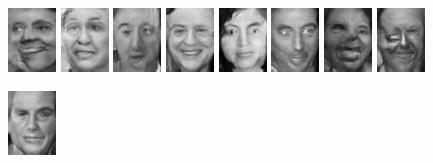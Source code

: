\begin{figure}[!h]
    \centerline{
        \includegraphics[scale=1]{figures/lfw/appendix2/lfw64x48bw_image0016.png}
        \includegraphics[scale=1]{figures/lfw/appendix2/lfw64x48bw_image0017.png}
        \includegraphics[scale=1]{figures/lfw/appendix2/lfw64x48bw_image0018.png}
        \includegraphics[scale=1]{figures/lfw/appendix2/lfw64x48bw_image0019.png}
        \includegraphics[scale=1]{figures/lfw/appendix2/lfw64x48bw_image0020.png}
        \includegraphics[scale=1]{figures/lfw/appendix2/lfw64x48bw_image0021.png}
        \includegraphics[scale=1]{figures/lfw/appendix2/lfw64x48bw_image0022.png}
        \includegraphics[scale=1]{figures/lfw/appendix2/lfw64x48bw_image0023.png}
    }
    \vspace{0.1cm}
    \centerline{
        \includegraphics[scale=1]{figures/lfw/appendix2/lfw64x48bw_image0024.png}
}
\end{figure}
